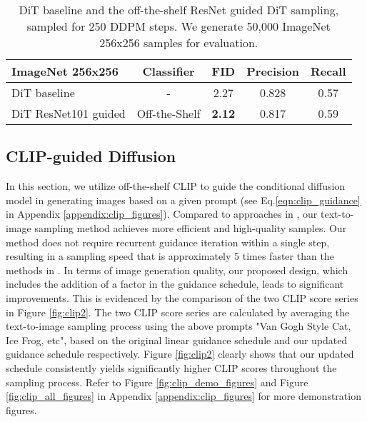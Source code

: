 \documentclass{article}
\theoremstyle{definition}
\begin{document}
\begin{table}[h!]
\caption{DiT \citep{peebles2022scalable} baseline and the off-the-shelf ResNet guided DiT sampling, sampled for 250 DDPM steps. We generate 50,000 ImageNet 256x256 samples for evaluation.}
\label{table:dit_guided_diffusion_results}
\begin{center}
\begin{small}
\begin{sc}
\begin{tabular}{lcccc}
\toprule
ImageNet 256x256 & Classifier & FID & Precision & Recall \\
\midrule
DiT baseline & -  &  2.27  & 0.828 & 0.57 \\
DiT  ResNet101 guided & Off-the-Shelf &  \bf{2.12}  & 0.817 & 0.59   \\

\bottomrule
\end{tabular}
\end{sc}
\end{small}
\end{center}
\end{table}


\subsection{CLIP-guided Diffusion}\label{sec:clip}
In this section, we utilize off-the-shelf CLIP \citep{radford2021learning} to guide the conditional diffusion model \citep{dhariwal2021diffusion} in generating images based on a given prompt (see Eq.\ref{eqn:clip_guidance} in Appendix \ref{appendix:clip_figures}).
Compared to approaches in \cite{bansal2023universal,wallace2023end}, our text-to-image sampling method achieves more efficient and high-quality samples. Our method does not require recurrent guidance iteration within a single step, resulting in a sampling speed that is approximately 5 times faster than the methods in \cite{bansal2023universal}. In terms of image generation quality, our proposed design, which includes the addition of a  factor in the guidance schedule, leads to significant improvements. This is evidenced by the comparison of the two CLIP score series in Figure \ref{fig:clip2}. The two CLIP score series are calculated by averaging the text-to-image sampling process using the above prompts "Van Gogh Style Cat, Ice Frog, etc", based on the original linear guidance schedule and our updated guidance schedule respectively. Figure \ref{fig:clip2} clearly shows that our updated schedule consistently yields significantly higher CLIP scores throughout the sampling process.
Refer to Figure \ref{fig:clip_demo_figures} and Figure \ref{fig:clip_all_figures} in Appendix \ref{appendix:clip_figures} for more demonstration figures. 
\end{document}
